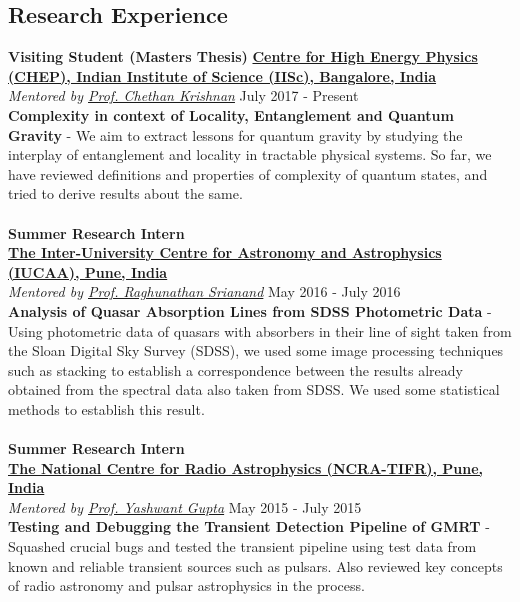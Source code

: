 \documentclass[margin, centered]{res}
\begin{document}
\begin{resume}
\section{Research Experience}
\textbf{Visiting Student (Masters Thesis)}
\textbf{\href{http://chep.iisc.ac.in/}{Centre for High Energy Physics (CHEP), Indian Institute of Science (IISc), Bangalore, India}}\\
\emph{Mentored by \href{http://chep.iisc.ac.in/Personnel/pages/chethan/index.html}{Prof. Chethan Krishnan}} \hfill July 2017 - Present\\
\textbf{Complexity in context of Locality, Entanglement and Quantum Gravity} - We aim to extract lessons for quantum gravity by studying the interplay of entanglement and locality in tractable physical systems. So far, we have reviewed definitions and properties of complexity of quantum states, and tried to derive results about the same.
\\
\\
\textbf{Summer Research Intern}
\\
\textbf{\href{http://www.iucaa.ernet.in/}{The Inter-University Centre for Astronomy and Astrophysics (IUCAA), Pune, India}}
\\
\emph{Mentored by \href{http://www.iucaa.ernet.in/~anand/}{Prof. Raghunathan Srianand}} \hfill May 2016 - July 2016\\
\textbf{Analysis of Quasar Absorption Lines from SDSS Photometric Data} - Using photometric data of quasars with absorbers in their line of sight taken from the Sloan Digital Sky Survey (SDSS), we used some image processing techniques such as stacking to establish a correspondence between the results already obtained from the spectral data also taken from SDSS. We used some statistical methods to establish this result. \\
\\
\textbf{Summer Research Intern}\\
\textbf{\href{http://www.ncra.tifr.res.in/}{The National Centre for Radio Astrophysics (NCRA-TIFR), Pune, India}}\\
\emph{Mentored by \href{http://www.ncra.tifr.res.in/ncra/people/academic/ncra-faculty/Yashwant_Gupta}{Prof. Yashwant Gupta}} \hfill May 2015 - July 2015\\
\textbf{Testing and Debugging the Transient Detection Pipeline of GMRT} - Squashed crucial bugs and tested the transient pipeline using test data from known and reliable transient sources such as pulsars. Also reviewed key concepts of radio astronomy and pulsar astrophysics in the process.



\end{resume}
\end{document}
